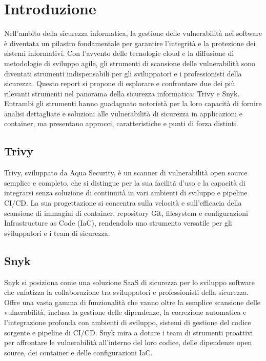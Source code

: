 \chapter{Introduzione}
Nell'ambito della sicurezza informatica, la gestione delle vulnerabilità nei software è diventata un pilastro fondamentale per garantire l'integrità e la protezione dei sistemi informativi. Con l'avvento delle tecnologie cloud e la diffusione di metodologie di sviluppo agile, gli strumenti di scansione delle vulnerabilità sono diventati strumenti indispensabili per gli sviluppatori e i professionisti della sicurezza. Questo report si propone di esplorare e confrontare due dei più rilevanti strumenti nel panorama della sicurezza informatica: Trivy e Snyk. Entrambi gli strumenti hanno guadagnato notorietà per la loro capacità di fornire analisi dettagliate e soluzioni alle vulnerabilità di sicurezza in applicazioni e container, ma presentano approcci, caratteristiche e punti di forza distinti.

\section*{Trivy}

Trivy, sviluppato da Aqua Security, è un scanner di vulnerabilità open source semplice e completo, che si distingue per la sua facilità d'uso e la capacità di integrarsi senza soluzione di continuità in vari ambienti di sviluppo e pipeline CI/CD. La sua progettazione si concentra sulla velocità e sull'efficacia della scansione di immagini di container, repository Git, filesystem e configurazioni Infrastructure as Code (IaC), rendendolo uno strumento versatile per gli sviluppatori e i team di sicurezza.

\section*{Snyk}

Snyk si posiziona come una soluzione SaaS di sicurezza per lo sviluppo software che enfatizza la collaborazione tra sviluppatori e professionisti della sicurezza. Offre una vasta gamma di funzionalità che vanno oltre la semplice scansione delle vulnerabilità, inclusa la gestione delle dipendenze, la correzione automatica e l'integrazione profonda con ambienti di sviluppo, sistemi di gestione del codice sorgente e pipeline di CI/CD. Snyk mira a dotare i team di strumenti proattivi per affrontare le vulnerabilità all'interno del loro codice, delle dipendenze open source, dei container e delle configurazioni IaC.

